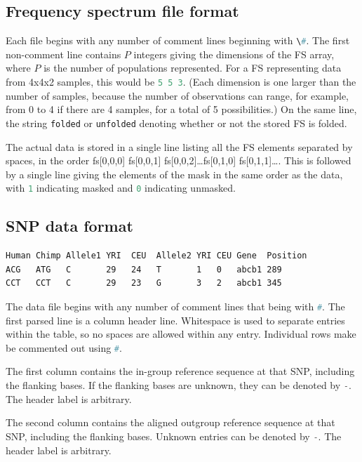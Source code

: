 \documentclass[12pt]{article}
\makeatletter
\newcommand{\py}[1]{\lstinline[language=Python, showstringspaces=False]@#1@}
\makeatother
\begin{document}
\subsection{Frequency spectrum file format}

Each file begins with any number of comment lines beginning with \py{\#}.
The first non-comment line contains $P$ integers giving the dimensions of the FS array, where $P$ is the number of populations represented.
For a FS representing data from 4x4x2 samples, this would be \py{5 5 3}.
(Each dimension is one larger than the number of samples, because the number of observations can range, for example, from 0 to 4 if there are 4 samples, for a total of 5 possibilities.)
On the same line, the string \py{folded} or \py{unfolded} denoting whether or not the stored FS is folded.

The actual data is stored in a single line listing all the FS elements separated by spaces, in the order fs[0,0,0] fs[0,0,1] fs[0,0,2]\dots fs[0,1,0] fs[0,1,1]\dots.
This is followed by a single line giving the elements of the mask in the same order as the data, with \py{1} indicating masked and \py{0} indicating unmasked.

\subsection{SNP data format}

\begin{lstlisting}[caption={Example of SNP file format}, label={lst:SNP_data}]
Human Chimp Allele1 YRI  CEU  Allele2 YRI CEU Gene  Position
ACG   ATG   C       29   24   T       1   0   abcb1 289
CCT   CCT   C       29   23   G       3   2   abcb1 345
\end{lstlisting}

The data file begins with any number of comment lines that being with \py{#}.
The first parsed line is a column header line.
Whitespace is used to separate entries within the table, so no spaces are allowed within any entry.
Individual rows make be commented out using \py{#}.

The first column contains the in-group reference sequence at that SNP, including the flanking bases.
If the flanking bases are unknown, they can be denoted by \py{-}.
The header label is arbitrary.

The second column contains the aligned outgroup reference sequence at that SNP, including the flanking bases.
Unknown entries can be denoted by \py{-}.
The header label is arbitrary.
\end{document}
